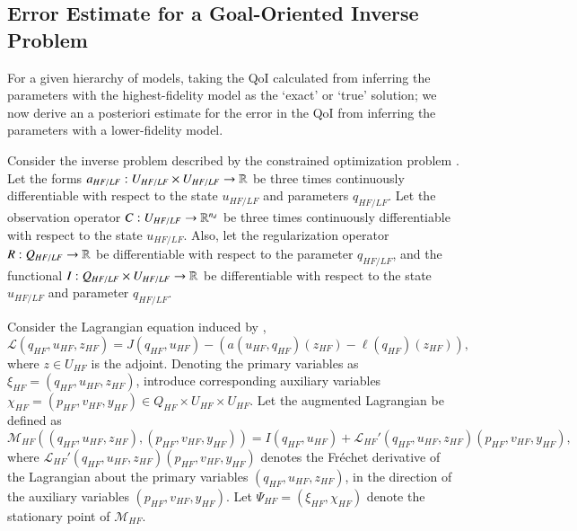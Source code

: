 \subsection[Error Estimate for a Goal-Oriented Inverse Problem]{Error Estimate for a Goal-Oriented Inverse Problem}  \label{sec:deriv}
%
For a given hierarchy of models, taking the QoI calculated from inferring the parameters with the highest-fidelity model as the `exact' or `true' solution; we now derive an a posteriori estimate for the error in the QoI from inferring the parameters with a lower-fidelity model.
%
\begin{proposition}
\label{thm:error_estimate}
Consider the inverse problem described by the constrained optimization problem . Let the forms $a_{HF/LF}:U_{HF/LF} \times U_{HF/LF} \to {\mathbb{R}}$ be three times continuously differentiable with respect to the state $u_{HF/LF}$ and parameters $q_{HF/LF}$. Let the observation operator $C:U_{HF/LF}\to{\mathbb{R}}^{n_d}$ be three times continuously differentiable with respect to the state $u_{HF/LF}$. Also, let the regularization operator $R:Q_{HF/LF}\to{\mathbb{R}}$ be differentiable with respect to the parameter $q_{HF/LF}$, and the functional $I:Q_{HF/LF}\times U_{HF/LF}\to{\mathbb{R}}$ be differentiable with respect to the state $u_{HF/LF}$ and parameter $q_{HF/LF}$.

Consider the Lagrangian equation induced by ,
%
\begin{equation}
\label{eq:InvsOpt_lag}
\mathcal{L}(q_{HF},u_{HF},z_{HF})= J(q_{HF},u_{HF})-(a(u_{HF},q_{HF})(z_{HF})-\ell(q_{HF})(z_{HF})),
\end{equation}
%
where $z\in U_{HF}$ is the adjoint. Denoting the primary variables as $\xi_{HF}=(q_{HF},u_{HF},z_{HF})$, introduce corresponding auxiliary variables $\chi_{HF} = (p_{HF},v_{HF},y_{HF})\in Q_{HF}\times U_{HF}\times U_{HF}$. Let the augmented Lagrangian be defined as
%
\begin{equation}
\label{eq:InvsOpt_auglag}
\mathcal{M}_{HF}((q_{HF},u_{HF},z_{HF}),(p_{HF},v_{HF},y_{HF})) = I(q_{HF},u_{HF}) + \mathcal{L}_{HF}'(q_{HF},u_{HF},z_{HF})(p_{HF},v_{HF},y_{HF}),
\end{equation}
%
where $\mathcal{L}_{HF}'(q_{HF},u_{HF},z_{HF})(p_{HF},v_{HF},y_{HF})$ denotes the Fr\'{e}chet derivative of the Lagrangian about the primary variables $(q_{HF},u_{HF},z_{HF})$, in the direction of the auxiliary variables $(p_{HF},v_{HF},y_{HF})$. Let $\Psi_{HF} = (\xi_{HF},\chi_{HF})$ denote the stationary point of $\mathcal{M}_{HF}$.


\end{proposition}
